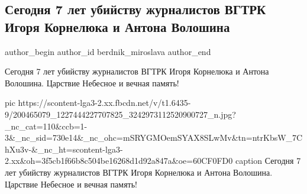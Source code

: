 
 
 
 
 
 
\subsection{Сегодня 7 лет убийству журналистов ВГТРК Игоря Корнелюка и Антона Волошина}
\label{sec:17_06_2021.fb.berdnik_miroslava.1.7_let_ubijstvo_zhurnalisty_korneljuk_voloshin_donbass}
\ifcmt
 author_begin
   author_id berdnik_miroslava
 author_end
\fi

Сегодня 7 лет убийству журналистов ВГТРК Игоря Корнелюка и Антона Волошина.
Царствие Небесное и вечная память!

\ifcmt
  pic https://scontent-lga3-2.xx.fbcdn.net/v/t1.6435-9/200465079_1227444227707825_3242973112520900727_n.jpg?_nc_cat=110&ccb=1-3&_nc_sid=730e14&_nc_ohc=mSRYGMOemSYAX8SLwMv&tn=ntrKbsW_7ChXu3v-&_nc_ht=scontent-lga3-2.xx&oh=3f5cb1f66b8c504be16268d1d92a847a&oe=60CF0FD0
	caption Сегодня 7 лет убийству журналистов ВГТРК Игоря Корнелюка и Антона Волошина. Царствие Небесное и вечная память!
\fi

